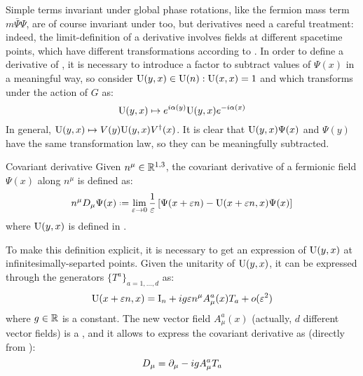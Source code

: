 Simple terms invariant under global phase rotations, like the fermion mass term $ m \bar{\Psi} \Psi $, are of course invariant under  too, but derivatives need a careful treatment: indeed, the limit-definition of a derivative involves fields at different spacetime points, which have different transformations according to . In order to define a derivative of \Psi, it is necessary to introduce a factor to subtract values of $ \Psi(x) $ in a meaningful way, so consider $ \mathrm{U}(y,x) \in \mathrm{U}(n) : \mathrm{U}(x,x) = 1 $ and which transforms under the action of $ G $ as:
\begin{equation}
  \mathrm{U}(y,x) \mapsto e^{i \alpha(y)} \mathrm{U}(y,x) e^{-i \alpha(x)}
  \label{eq:fac-cov-der}
\end{equation}
In general, $ \mathrm{U}(y,x) \mapsto V(y) \mathrm{U}(y,x) V^\dagger(x) $. It is clear that $ \mathrm{U}(y,x) \Psi(x) $ and $ \Psi(y) $ have the same transformation law, so they can be meaningfully subtracted. 
\begin{definition}{Covariant derivative}{}
  Given $ n^\mu \in \mathbb{R}^{1,3} $, the covariant derivative of a fermionic field $ \Psi(x) $ along $ n^\mu $ is defined as:
  \begin{equation}
    n^\mu D_\mu \Psi(x) \defeq \lim_{\varepsilon \rightarrow 0} \frac{1}{\varepsilon} \left[ \Psi(x + \varepsilon n) - \tens{U}(x + \varepsilon n, x) \Psi(x) \right]
    \label{eq:cov-der-def}
  \end{equation}
  where $ \mathrm{U}(y,x) $ is defined in .
\end{definition}

To make this definition explicit, it is necessary to get an expression of $ \mathrm{U}(y,x) $ at infinitesimally-separted points. Given the unitarity of $ \mathrm{U}(y,x) $, it can be expressed through the generators $ \{T^a\}_{a = 1, \dots, d} $ as:
\begin{equation}
  \mathrm{U}(x + \varepsilon n, x) = \mathrm{I}_n + i g \varepsilon n^\mu A_\mu^a(x) T_a + o(\varepsilon^2)
  \label{eq:fac-cov-der-exp}
\end{equation}
where $ g \in \mathbb{R} $ is a constant. The new vector field $ A_\mu^a(x) $ (actually, $ d $ different vector fields) is a , and it allows to express the covariant derivative as (directly from ):
\begin{equation}
  D_\mu = \partial_\mu - i g A_\mu^a T_a
\end{equation}

